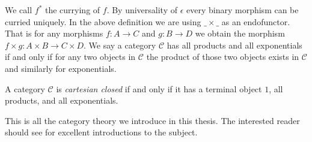 We call ${f}^*$ the currying of $f$.  By universality of $\epsilon$
every binary morphism can be curried uniquely.  In the above
definition we are using $\_ \times \_$ as an endofunctor.  That is for
any morphisms $f : A \to C$ and $g : B \to D$ we obtain the morphism
$f \times g : A \times B \to C \times D$.  We say a category
$\mathcal{C}$ has all products and all exponentials if and only if for
any two objects in $\mathcal{C}$ the product of those two objects
exists in $\mathcal{C}$ and similarly for exponentials.
\begin{definition}
  \label{def:cartesian}
  A category $\mathcal{C}$ is \emph{cartesian closed} if and only if 
  it has a terminal object $1$, all products, and all exponentials.
\end{definition}
\noindent
This is all the category theory we introduce in this thesis.  The
interested reader should
see \cite{Crole:1994,Gunter:1992,Lawvere:2009,Pierce:1991} for
excellent introductions to the subject.

